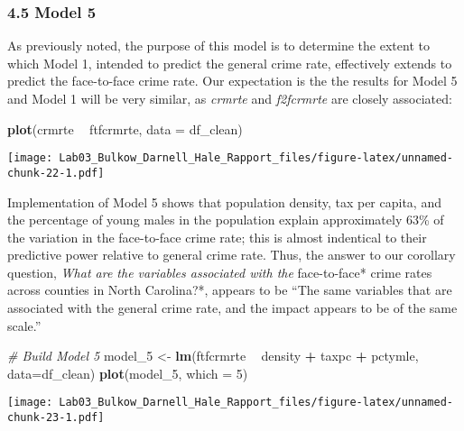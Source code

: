 \documentclass[]{article}
\newenvironment{Shaded}{\begin{snugshade}}{\end{snugshade}}
\newcommand{\KeywordTok}[1]{\textcolor[rgb]{0.13,0.29,0.53}{\textbf{#1}}}
\newcommand{\DataTypeTok}[1]{\textcolor[rgb]{0.13,0.29,0.53}{#1}}
\newcommand{\DecValTok}[1]{\textcolor[rgb]{0.00,0.00,0.81}{#1}}
\newcommand{\StringTok}[1]{\textcolor[rgb]{0.31,0.60,0.02}{#1}}
\newcommand{\CommentTok}[1]{\textcolor[rgb]{0.56,0.35,0.01}{\textit{#1}}}
\newcommand{\OperatorTok}[1]{\textcolor[rgb]{0.81,0.36,0.00}{\textbf{#1}}}
\newcommand{\NormalTok}[1]{#1}
\begin{document}
\subsubsection{4.5 Model 5}\label{model-5}

As previously noted, the purpose of this model is to determine the
extent to which Model 1, intended to predict the general crime rate,
effectively extends to predict the face-to-face crime rate. Our
expectation is the the results for Model 5 and Model 1 will be very
similar, as \emph{crmrte} and \emph{f2fcrmrte} are closely associated:

\begin{Shaded}
\begin{Highlighting}[]
\KeywordTok{plot}\NormalTok{(crmrte }\OperatorTok{~}\StringTok{ }\NormalTok{ftfcrmrte, }\DataTypeTok{data =}\NormalTok{ df_clean)}
\end{Highlighting}
\end{Shaded}

\texttt{[image: Lab03\_Bulkow\_Darnell\_Hale\_Rapport\_files/figure-latex/unnamed-chunk-22-1.pdf]}

Implementation of Model 5 shows that population density, tax per capita,
and the percentage of young males in the population explain
approximately 63\% of the variation in the face-to-face crime rate; this
is almost indentical to their predictive power relative to general crime
rate. Thus, the answer to our corollary question, \emph{What are the
variables associated with the }face-to-face* crime rates across counties
in North Carolina?*, appears to be ``The same variables that are
associated with the general crime rate, and the impact appears to be of
the same scale.''

\begin{Shaded}
\begin{Highlighting}[]
\CommentTok{# Build Model 5}
\NormalTok{model_}\DecValTok{5}\NormalTok{ <-}\StringTok{ }\KeywordTok{lm}\NormalTok{(ftfcrmrte }\OperatorTok{~}\StringTok{ }\NormalTok{density }\OperatorTok{+}\StringTok{ }\NormalTok{taxpc }\OperatorTok{+}\StringTok{ }\NormalTok{pctymle, }\DataTypeTok{data=}\NormalTok{df_clean)}
\KeywordTok{plot}\NormalTok{(model_}\DecValTok{5}\NormalTok{, }\DataTypeTok{which =} \DecValTok{5}\NormalTok{)}
\end{Highlighting}
\end{Shaded}

\texttt{[image: Lab03\_Bulkow\_Darnell\_Hale\_Rapport\_files/figure-latex/unnamed-chunk-23-1.pdf]}
\end{document}
